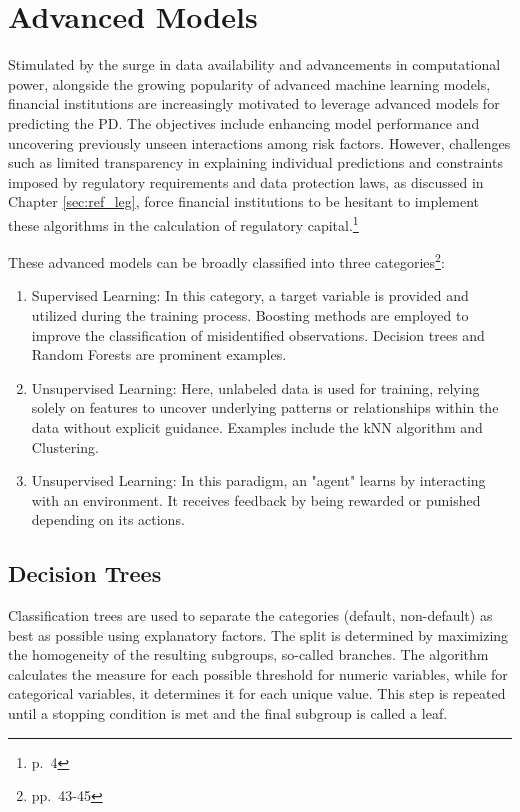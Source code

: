 \chapter{Advanced Models}
\label{ch:AM}
Stimulated by the surge in data availability and advancements in computational power, alongside the growing popularity of advanced machine learning models, financial institutions are increasingly motivated to leverage advanced models for predicting the \acl{PD}. The objectives include enhancing model performance and uncovering previously unseen interactions among risk factors. However, challenges such as limited transparency in explaining individual predictions and constraints imposed by regulatory requirements and data protection laws, as discussed in Chapter \ref{sec:ref_leg}, force financial institutions to be hesitant to implement these algorithms in the calculation of regulatory capital.\footnote{\cite{EBA:2023} p.~4}

These advanced models can be broadly classified into three categories\footnote{\cite{Roberts2022} pp.~43-45}:

\begin{enumerate}
  \item Supervised Learning: In this category, a target variable is provided and utilized during the training process. Boosting methods are employed to improve the classification of misidentified observations. Decision trees and Random Forests are prominent examples.
\item Unsupervised Learning: Here, unlabeled data is used for training, relying solely on features to uncover underlying patterns or relationships within the data without explicit guidance. Examples include the kNN algorithm and Clustering.
\item Unsupervised Learning: In this paradigm, an "agent" learns by interacting with an environment. It receives feedback by being rewarded or punished depending on its actions. 
\end{enumerate}

\section{Decision Trees}
\label{sec:dectrees}
Classification trees are used to separate the categories (default, non-default) as best as possible using explanatory factors. The split is determined by maximizing the homogeneity of the resulting subgroups, so-called branches. The algorithm calculates the measure for each possible threshold for numeric variables, while for categorical variables, it determines it for each unique value. This step is repeated until a stopping condition is met and the final subgroup is called a leaf. 

